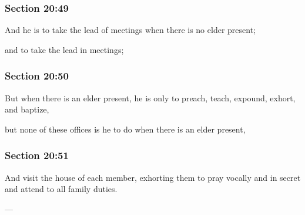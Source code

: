 	\subsubsection{Section 20:49} %
		\label{DC20-49}

		And he is to take the lead of meetings when there is no elder present;

		\begin{framed}
		\scriptsize
			\begin{compactdesc}
				\item[JSP] and to take the lead in meetings; 
				\item[RB1] 
				\item[BC] 
			\end{compactdesc}
		\end{framed}

	\subsubsection{Section 20:50} %
		\label{DC20-50}

		But when there is an elder present, he is only to preach, teach, expound, exhort, and baptize,

		\begin{framed}
		\scriptsize
			\begin{compactdesc}
				\item[JSP] but none of these offices is he to do when there is an elder present, 
				\item[RB1] 
				\item[BC] 
			\end{compactdesc}
		\end{framed}

	\subsubsection{Section 20:51} %
		\label{DC20-51}

		And visit the house of each member, exhorting them to pray vocally and in secret and attend to all family duties.

		\begin{framed}
		\scriptsize
			\begin{compactdesc}
				\item[JSP] ---
				\item[RB1] 
				\item[BC] 
			\end{compactdesc}
		\end{framed}

